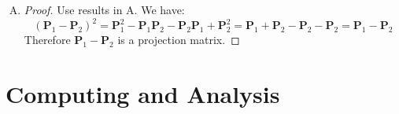 \documentclass[12pt]{article}
\newcommand{\ttt}[1]{\textbf{#1}}
\begin{document}
\begin{enumerate}
\begin{enumerate}[A.]
\begin{proof}
            Because:
            $$(\ttt{I} - \ttt{P}_1)^\top \ttt{P}_2 (\ttt{I} - \ttt{P}_1) = (\ttt{I} - \ttt{P}_1)^\top \ttt{P}_2^\top \ttt{P}_2 (\ttt{I} - \ttt{P}_1) = (\ttt{P}_2 (\ttt{I} - \ttt{P}_1))^\top \ttt{P}_2 (\ttt{I} - \ttt{P}_1) = \ttt{0}$$ 
            We have $\ttt{P}_2 (\ttt{I} - \ttt{P}_1) = \ttt{0}$, which shows $\ttt{P}_2 = \ttt{P}_2 \ttt{P}_1$.
            Meanwhile we have $$\ttt{P}_2 = \ttt{P}_2^\top = (\ttt{P}_2 \ttt{P}_1)^\top = \ttt{P}_1^\top \ttt{P}_2^\top = \ttt{P}_1 \ttt{P}_1$$
            Therefore $\ttt{P}_1 \ttt{P}_2 = \ttt{P}_2 \ttt{P}_1 = \ttt{P}_2$.
        \end{proof}

        \item 
        \begin{proof}
            Use results in A. We have:
            $$(\ttt{P}_1 - \ttt{P}_2)^2 = \ttt{P}_1^2 - \ttt{P}_1\ttt{P}_2 -\ttt{P}_2\ttt{P}_1 + \ttt{P}_2^2 = \ttt{P}_1 + \ttt{P}_2 - \ttt{P}_2 - \ttt{P}_2 = \ttt{P}_1 - \ttt{P}_2$$
            Therefore $\ttt{P}_1 - \ttt{P}_2$ is a projection matrix.
        \end{proof}
    \end{enumerate}

\end{enumerate}

\section{Computing and Analysis}

\end{document}
